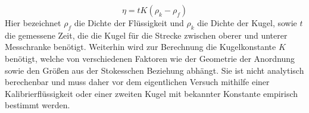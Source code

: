 \begin{equation}
\eta = tK(\rho_k - \rho_f)
\end{equation}
Hier bezeichnet $\rho_f$ die Dichte der Flüssigkeit und $\rho_k$ die Dichte der Kugel, sowie $t$ die gemessene Zeit, die die Kugel für die Strecke zwischen oberer und unterer Messchranke benötigt. Weiterhin wird zur Berechnung die Kugelkonstante $K$ benötigt, welche von verschiedenen Faktoren wie der Geometrie der Anordnung sowie den Größen aus der Stokesschen Beziehung abhängt. Sie ist nicht analytisch berechenbar und muss daher vor dem eigentlichen Versuch mithilfe einer Kalibrierflüssigkeit oder einer zweiten Kugel mit bekannter Konstante empirisch bestimmt werden.
